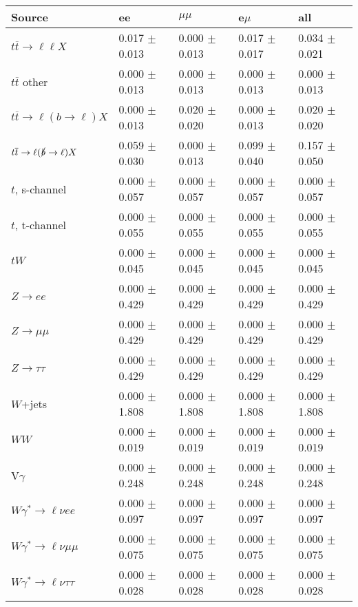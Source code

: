 \begin{tabular}{l | l l l l}
\hline\hline
 Source  &  ee  &  $\mu\mu$  &  e$\mu$  &  all \\
\hline
$t\overline{t}\rightarrow \ell\ell X$ &  0.017 $\pm$  0.013 &  0.000 $\pm$  0.013 &  0.017 $\pm$  0.017 &  0.034 $\pm$  0.021\\
$t\overline{t}$ other &  0.000 $\pm$  0.013 &  0.000 $\pm$  0.013 &  0.000 $\pm$  0.013 &  0.000 $\pm$  0.013\\
$t\overline{t}\rightarrow \ell(b\rightarrow \ell)X$ &  0.000 $\pm$  0.013 &  0.020 $\pm$  0.020 &  0.000 $\pm$  0.013 &  0.020 $\pm$  0.020\\
$t\overline{t}\rightarrow \ell(\slashed{b}\rightarrow \ell)X$ &  0.059 $\pm$  0.030 &  0.000 $\pm$  0.013 &  0.099 $\pm$  0.040 &  0.157 $\pm$  0.050\\
\hline
$t$, s-channel &  0.000 $\pm$  0.057 &  0.000 $\pm$  0.057 &  0.000 $\pm$  0.057 &  0.000 $\pm$  0.057\\
$t$, t-channel &  0.000 $\pm$  0.055 &  0.000 $\pm$  0.055 &  0.000 $\pm$  0.055 &  0.000 $\pm$  0.055\\
$tW$ &  0.000 $\pm$  0.045 &  0.000 $\pm$  0.045 &  0.000 $\pm$  0.045 &  0.000 $\pm$  0.045\\
\hline
$Z\rightarrow ee$ &  0.000 $\pm$  0.429 &  0.000 $\pm$  0.429 &  0.000 $\pm$  0.429 &  0.000 $\pm$  0.429\\
$Z\rightarrow\mu\mu$ &  0.000 $\pm$  0.429 &  0.000 $\pm$  0.429 &  0.000 $\pm$  0.429 &  0.000 $\pm$  0.429\\
$Z\rightarrow\tau\tau$ &  0.000 $\pm$  0.429 &  0.000 $\pm$  0.429 &  0.000 $\pm$  0.429 &  0.000 $\pm$  0.429\\
$W$+jets &  0.000 $\pm$  1.808 &  0.000 $\pm$  1.808 &  0.000 $\pm$  1.808 &  0.000 $\pm$  1.808\\
$WW$ &  0.000 $\pm$  0.019 &  0.000 $\pm$  0.019 &  0.000 $\pm$  0.019 &  0.000 $\pm$  0.019\\
\hline
V$\gamma$ &  0.000 $\pm$  0.248 &  0.000 $\pm$  0.248 &  0.000 $\pm$  0.248 &  0.000 $\pm$  0.248\\
$W\gamma^{*}\rightarrow\ell\nu e e$ &  0.000 $\pm$  0.097 &  0.000 $\pm$  0.097 &  0.000 $\pm$  0.097 &  0.000 $\pm$  0.097\\
$W\gamma^{*}\rightarrow\ell\nu\mu\mu$ &  0.000 $\pm$  0.075 &  0.000 $\pm$  0.075 &  0.000 $\pm$  0.075 &  0.000 $\pm$  0.075\\
$W\gamma^{*}\rightarrow\ell\nu\tau\tau$ &  0.000 $\pm$  0.028 &  0.000 $\pm$  0.028 &  0.000 $\pm$  0.028 &  0.000 $\pm$  0.028\\

\end{tabular}
